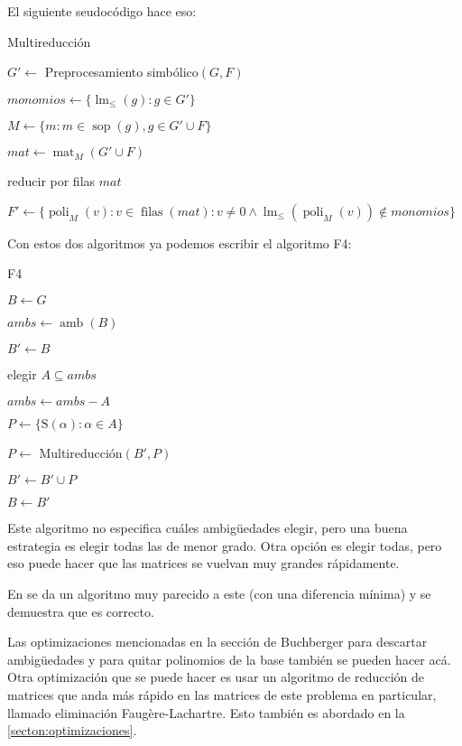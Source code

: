 \documentclass[12pt]{report}
\theoremstyle{customstyle}
\theoremstyle{factstyle}
\DeclareMathOperator{\sop}{sop}
\DeclareMathOperator{\lm}{lm}
\DeclareMathOperator{\amb}{amb}
\renewcommand{\S}{\text{S}}
\DeclareMathOperator{\mat}{mat}
\DeclareMathOperator{\poli}{poli}
\DeclareMathOperator{\filas}{filas}
\begin{document}
El siguiente seudocódigo hace eso:

\begin{algorithm}[H] %
  \caption{Multireducción}\label{alg:Multireducción}
  $G' ←$ Preprocesamiento simbólico$(G, F)$

  $monomios ← \{\lm_≤(g) : g ∈ G'\}$

  $M ← \{m : m ∈ \sop(g), g ∈ G' ∪ F\}$

  $mat ← \mat_M(G' ∪ F)$

  reducir por filas $mat$

  $F' ← \{\poli_M(v) : v ∈ \filas(mat) : v ≠ 0 ∧ \lm_≤(\poli_M(v)) ∉ monomios\}$

\end{algorithm}

Con estos dos algoritmos ya podemos escribir el algoritmo F4:

\begin{algorithm}[H] %
  \caption{F4}\label{alg:F4}
  $B ← G$

  \Loop{} {
    $ambs ← \amb(B)$

    $B' ← B$

     {
      elegir $Α ⊆ ambs$

      $ambs ← ambs - Α$

      $P ← \{\S(α) : α ∈ Α\}$

      $P ←$ Multireducción$(B', P)$

      $B' ← B' ∪ P$
    }

     {
      \Break
    }

    $B ← B'$
  }

\end{algorithm}

Este algoritmo no especifica cuáles ambigüedades elegir, pero una buena estrategia es elegir todas las de menor grado. Otra opción es elegir todas, pero eso puede hacer que las matrices se vuelvan muy grandes rápidamente.

En \cite{thesis:Hof20} se da un algoritmo muy parecido a este (con una diferencia mínima) y se demuestra que es correcto.

Las optimizaciones mencionadas en la sección de Buchberger para descartar ambigüedades y para quitar polinomios de la base también se pueden hacer acá. Otra optimización que se puede hacer es usar un algoritmo de reducción de matrices que anda más rápido en las matrices de este problema en particular, llamado eliminación Faugère-Lachartre. Esto también es abordado en la \cref{secton:optimizaciones}.
\end{document}
